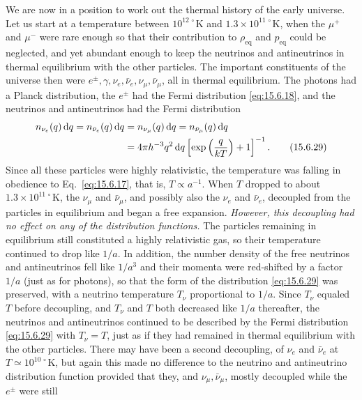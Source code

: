 We are now in a position to work out the thermal history of the early
universe. Let us start at a temperature between \(10^{12\,\circ}\mathrm K\)
and \(1.3\times10^{11\,\circ}\mathrm K\), when the \(\mu^+\) and \(\mu^-\)
were rare enough so that their contribution to \(\rho_{\mathrm{eq}}\) and
\(p_{\mathrm{eq}}\) could be neglected, and yet abundant enough to keep the
neutrinos and antineutrinos in thermal equilibrium with the other particles.
The important constituents of the universe then were
\(e^\pm,\gamma,\nu_e,\bar\nu_e,\nu_\mu,\bar\nu_\mu\), all in thermal
equilibrium. The photons had a Planck distribution, the \(e^\pm\) had the
Fermi distribution \eqref{eq:15.6.18}, and the neutrinos and antineutrinos had
the Fermi distribution
\begin{align}
  n_{\nu_e}(q)\mathop{}\!\mathrm{d} q
  =
  n_{\bar\nu_e}(q)\mathop{}\!\mathrm{d} q
  &=
  n_{\nu_\mu}(q)\mathop{}\!\mathrm{d} q
  =
  n_{\bar\nu_\mu}(q)\mathop{}\!\mathrm{d} q
  \notag\\
  &=
  4\pi h^{-3}q^2\mathop{}\!\mathrm{d} q
  \left[\exp\left(\frac q{kT}\right)+1\right]^{-1}.
  \tag{15.6.29}\label{eq:15.6.29}
\end{align}
Since all these particles were highly relativistic, the temperature was
falling in obedience to Eq.~\eqref{eq:15.6.17}, that is,
\(T\propto a^{-1}\). When \(T\) dropped to about
\(1.3\times10^{11\,\circ}\mathrm K\), the \(\nu_\mu\) and \(\bar\nu_\mu\),
and possibly also the \(\nu_e\) and \(\bar\nu_e\), decoupled from the particles
in equilibrium and began a free expansion. \emph{However, this decoupling had
no effect on any of the distribution functions.} The particles remaining in
equilibrium still constituted a highly relativistic gas, so their temperature
continued to drop like \(1/a\). In addition, the number density of the free
neutrinos and antineutrinos fell like \(1/a^3\) and their momenta were
red-shifted by a factor \(1/a\) (just as for photons), so that the form of the
distribution \eqref{eq:15.6.29} was preserved, with a neutrino temperature
\(T_\nu\) proportional to \(1/a\). Since \(T_\nu\) equaled \(T\) before
decoupling, and \(T_\nu\) and \(T\) both decreased like \(1/a\) thereafter,
the neutrinos and antineutrinos continued to be described by the Fermi
distribution \eqref{eq:15.6.29} with \(T_\nu=T\), just as if they had remained
in thermal equilibrium with the other particles. There may have been a second
decoupling, of \(\nu_e\) and \(\bar\nu_e\) at
\(T\simeq10^{10\,\circ}\mathrm K\), but again this made no difference to the
neutrino and antineutrino distribution function provided that they, and
\(\nu_\mu,\bar\nu_\mu\), mostly decoupled while the \(e^\pm\) were still
